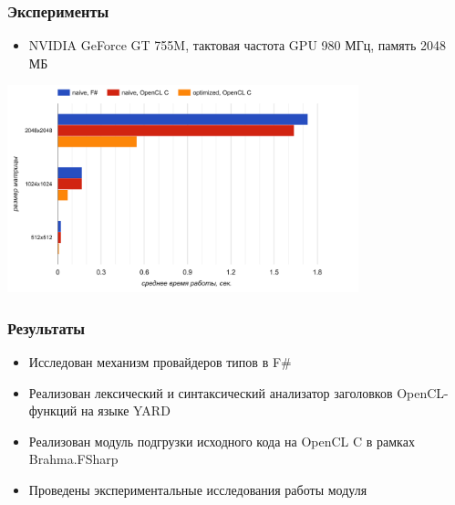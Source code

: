 \documentclass{beamer}
\begin{document}
\begin{frame}[t]
  \transwipe[direction=90]
  \frametitle{Эксперименты}
  \begin{itemize}
    \item NVIDIA GeForce GT 755M, тактовая частота GPU 980 МГц, память 2048 МБ
  \end{itemize}
  \begin{center}
      \includegraphics[height=6cm]{pictures/chart.png}
  \end{center}
\end{frame}

\begin{frame}
  \transwipe[direction=90]
  \frametitle{Результаты}
  \begin{itemize}
    \item Исследован механизм провайдеров типов в F\#
    \item Реализован лексический и синтаксический анализатор заголовков OpenCL-функций на языке YARD
    \item Реализован модуль подгрузки исходного кода на OpenCL C в рамках Brahma.FSharp
    \item Проведены экспериментальные исследования работы модуля
  \end{itemize}
\end{frame}
\end{document}
